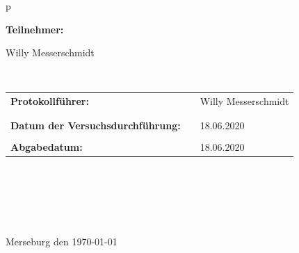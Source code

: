 \begin{center}
\begin{tabular}{p{\textwidth}}
\begin{center}
\Large{\textbf{Teilnehmer:}} \\ 
\end{center}
\begin{center}
\large{
	Willy Messerschmidt}
	
\end{center}


\\

\begin{center}
\begin{tabular}{lll}
\large{\textbf{Protokollführer:}} & & \large{Willy Messerschmidt} \\
&& \\
&&\\
\large{\textbf{Datum der Versuchsdurchführung:}}&& \large{18.06.2020}\\
&&\\
\large{\textbf{Abgabedatum:}}&& \large{18.06.2020}
\end{tabular}
\end{center}

\\ \\ \\ \\ \\ 
\large{Merseburg den \today}

\end{tabular}
\end{center}
